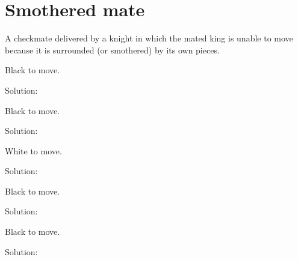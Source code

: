 \documentclass{book}
\begin{document}
\section{Smothered mate}
A checkmate delivered by a knight in which the mated king is unable to move because it is surrounded (or smothered) by its own pieces.\begin{multicols}{2} 
\begin{samepage} 
\newgame 


 
\showboard
 
 Black to move. 
 
Solution: 
 
\end{samepage}\begin{samepage} 
\newgame 


 
\showboard
 
 Black to move. 
 
Solution: 
 
\end{samepage}\begin{samepage} 
\newgame 


 
\showboard
 
 White to move. 
 
Solution: 
 
\end{samepage}\begin{samepage} 
\newgame 


 
\showboard
 
 Black to move. 
 
Solution: 
 
\end{samepage}\begin{samepage} 
\newgame 


 
\showboard
 
 Black to move. 
 
Solution: 
 
\end{samepage}\end{multicols} 
\newpage 
\end{document}
